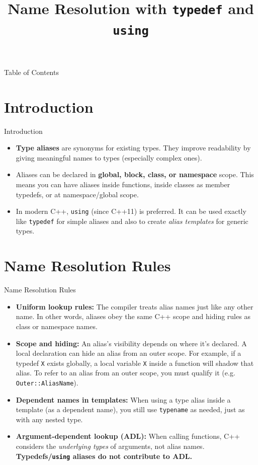 \documentclass{beamer}
\title{Name Resolution with \texttt{typedef} and \texttt{using}}
\author{}
\date{}
\begin{document}
\frame{\titlepage}

\begin{frame}{Table of Contents}
  \tableofcontents
\end{frame}

\section{Introduction}
\begin{frame}{Introduction}
\begin{itemize}
\item \textbf{Type aliases} are synonyms for existing types. They improve readability by giving meaningful names to types (especially complex ones).
\item Aliases can be declared in \textbf{global, block, class, or namespace} scope. This means you can have aliases inside functions, inside classes as member typedefs, or at namespace/global scope.
\item In modern C++, \texttt{using} (since C++11) is preferred. It can be used exactly like \texttt{typedef} for simple aliases and also to create \textsl{alias templates} for generic types.
\end{itemize}
\end{frame}
\section{Name Resolution Rules}
\begin{frame}{Name Resolution Rules}
\begin{itemize}
\item \textbf{Uniform lookup rules:} The compiler treats alias names just like any other name. In other words, aliases obey the same C++ scope and hiding rules as class or namespace names.
\item \textbf{Scope and hiding:} An alias’s visibility depends on where it’s declared. A local declaration can hide an alias from an outer scope. For example, if a typedef \texttt{X} exists globally, a local variable \texttt{X} inside a function will shadow that alias. To refer to an alias from an outer scope, you must qualify it (e.g. \texttt{Outer::AliasName}).
\item \textbf{Dependent names in templates:} When using a type alias inside a template (as a dependent name), you still use \texttt{typename} as needed, just as with any nested type.
\item \textbf{Argument-dependent lookup (ADL):} When calling functions, C++ considers the \textsl{underlying types} of arguments, not alias names. \textbf{Typedefs/\texttt{using} aliases do not contribute to ADL. }
\end{itemize}
\end{frame}
\end{document}
